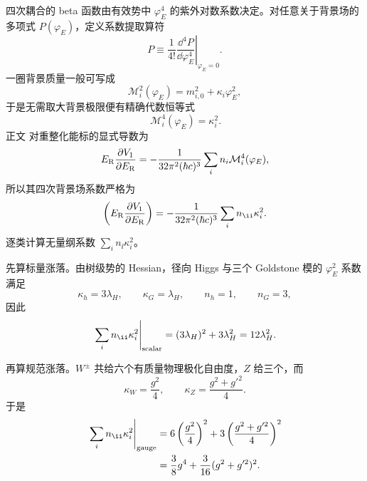 \begin{derivation}
四次耦合的 beta 函数由有效势中 $\varphi_E^4$ 的紫外对数系数决定。对任意关于背景场的多项式 $P(\varphi_E)$，定义系数提取算符
\begin{equation*}
 [\varphi_E^4]P
 \equiv\frac1{4!}\left.\frac{\dd^4P}{\dd\varphi_E^4}\right|_{\varphi_E=0}.
\end{equation*}
一圈背景质量一般可写成
\begin{equation*}
 \mathcal M_i^2(\varphi_E)=m_{i,0}^2+\kappa_i\varphi_E^2,
\end{equation*}
于是无需取大背景极限便有精确代数恒等式
\begin{equation*}
 [\varphi_E^4]\,\mathcal M_i^4(\varphi_E)=\kappa_i^2.
\end{equation*}
正文 对重整化能标的显式导数为
\begin{equation*}
 E_{\rm R}\frac{\partial V_1}{\partial E_{\rm R}}
 =-\frac1{32\pi^2(\hbar c)^3}
 \sum_i n_i\mathcal M_i^4(\varphi_E),
\end{equation*}
所以其四次背景场系数严格为
\begin{equation*}
 [\varphi_E^4]\left(E_{\rm R}\frac{\partial V_1}{\partial E_{\rm R}}\right)
 =-\frac1{32\pi^2(\hbar c)^3}\sum_i n_\ii\kappa_i^2.
\end{equation*}
逐类计算无量纲系数 $\sum_i n_\ii\kappa_i^2$。

先算标量涨落。由树级势的 Hessian，径向 Higgs 与三个 Goldstone 模的 $\varphi_E^2$ 系数满足
\begin{equation*}
 \kappa_h=3\lambda_H,
 \qquad
 \kappa_G=\lambda_H,
 \qquad
 n_h=1,
 \qquad
 n_G=3,
\end{equation*}
因此
\begin{equation*}
 \left.\sum_i n_\ii\kappa_i^2\right|_{\rm scalar}
 =(3\lambda_H)^2+3\lambda_H^2
 =12\lambda_H^2.
\end{equation*}

再算规范涨落。$W^\pm$ 共给六个有质量物理极化自由度，$Z$ 给三个，而
\begin{equation*}
 \kappa_W=\frac{g^2}{4},
 \qquad
 \kappa_Z=\frac{g^2+g'^2}{4}.
\end{equation*}
于是
\begin{align*}
 \left.\sum_i n_\ii\kappa_i^2\right|_{\rm gauge}
 &=6\left(\frac{g^2}{4}\right)^2
 +3\left(\frac{g^2+g'^2}{4}\right)^2\\
 &=\frac38g^4+\frac{3}{16}(g^2+g'^2)^2.
\end{align*}


\end{derivation}
